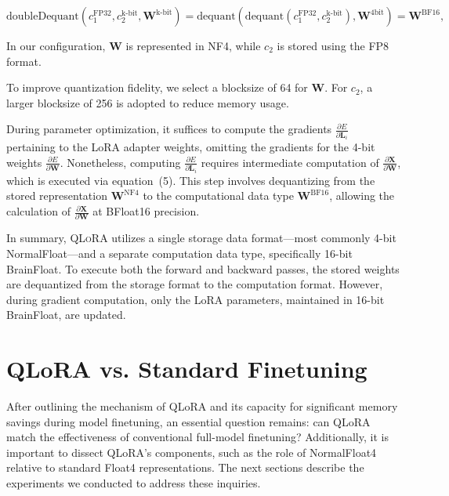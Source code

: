 \begin{equation}
    \text{doubleDequant}(c_1^{\text{FP32}}, c_2^{\text{k-bit}}, \mathbf{W}^{\text{k-bit}}) = \text{dequant}(\text{dequant}(c_1^{\text{FP32}}, c_2^{\text{k-bit}}), \mathbf{W}^{\text{4bit}}) = \mathbf{W}^{\text{BF16}},
\end{equation}

In our configuration, $\mathbf{W}$ is represented in NF4, while $c_2$ is stored using the FP8 format.

To improve quantization fidelity, we select a blocksize of 64 for $\mathbf{W}$. For $c_2$, a larger blocksize of 256 is adopted to reduce memory usage.

During parameter optimization, it suffices to compute the gradients $\frac{\partial E}{\partial \mathbf{L}_i}$ pertaining to the LoRA adapter weights, omitting the gradients for the 4-bit weights $\frac{\partial E}{\partial \mathbf{W}}$. Nonetheless, computing $\frac{\partial E}{\partial \mathbf{L}_i}$ requires intermediate computation of $\frac{\partial \mathbf{X}}{\partial \mathbf{W}}$, which is executed via equation~(5). This step involves dequantizing from the stored representation $\mathbf{W}^{\text{NF4}}$ to the computational data type $\mathbf{W}^{\text{BF16}}$, allowing the calculation of $\frac{\partial \mathbf{X}}{\partial \mathbf{W}}$ at BFloat16 precision.

In summary, \textsc{QLoRA} utilizes a single storage data format—most commonly 4-bit NormalFloat—and a separate computation data type, specifically 16-bit BrainFloat. To execute both the forward and backward passes, the stored weights are dequantized from the storage format to the computation format. However, during gradient computation, only the LoRA parameters, maintained in 16-bit BrainFloat, are updated.

\section{QLoRA vs. Standard Finetuning}
\label{sec:comp_to_std}

After outlining the mechanism of QLoRA and its capacity for significant memory savings during model finetuning, an essential question remains: can QLoRA match the effectiveness of conventional full-model finetuning? Additionally, it is important to dissect QLoRA's components, such as the role of NormalFloat4 relative to standard Float4 representations. The next sections describe the experiments we conducted to address these inquiries.

